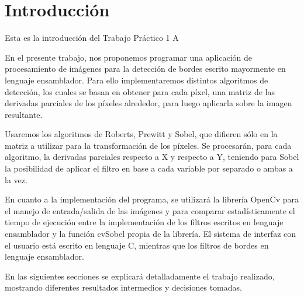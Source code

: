 \section{Introducci\'on}
\noindent Esta es la introducci\'on del Trabajo Pr\'actico 1 A

En el presente trabajo, nos proponemos programar una aplicación de procesamiento de imágenes para la detección de bordes escrito mayormente en lenguaje ensamblador. Para ello implementaremos distintos algoritmos de detección, los cuales se basan en obtener para cada píxel, una matriz de las derivadas parciales de los píxeles alrededor, para luego aplicarla sobre la imagen resultante. 
	

Usaremos los algoritmos de Roberts, Prewitt y Sobel, que difieren sólo en la matriz a utilizar para la transformación de los píxeles.  Se procesarán, para cada algoritmo, la derivadas parciales respecto a X y respecto a Y, teniendo para Sobel la posibilidad de aplicar el filtro en base a cada variable por separado o ambas a la vez.

	
En cuanto a la implementación del programa, se utilizará la librería OpenCv para el manejo de entrada/salida de las imágenes y para comparar estadísticamente el tiempo de ejecución entre la implementación de los filtros escritos en lenguaje ensamblador y la función cvSobel propia de la librería. El sistema de interfaz con el usuario está escrito en lenguaje C, mientras que los filtros de bordes en lenguaje ensamblador.

En las siguientes secciones se explicará detalladamente el trabajo realizado, mostrando diferentes resultados intermedios y decisiones tomadas.
